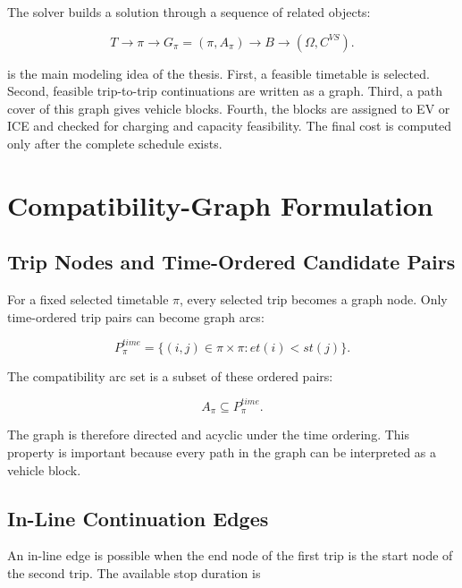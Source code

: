 The solver builds a solution through a sequence of related objects:

\begin{equation}
T
\longrightarrow
\pi
\longrightarrow
G_\pi=(\pi,A_\pi)
\longrightarrow
B
\longrightarrow
(\Omega,C^{VS}).
\label{eq:layered-decision-chain}
\end{equation}

 is the main modeling idea of the thesis.
First, a feasible timetable is selected. Second, feasible trip-to-trip
continuations are written as a graph. Third, a path cover of this graph gives
vehicle blocks. Fourth, the blocks are assigned to EV or ICE and checked for
charging and capacity feasibility. The final cost is computed only after the
complete schedule exists.

\section{Compatibility-Graph Formulation}
\label{sec:compatibility-graph-formulation}

\subsection{Trip Nodes and Time-Ordered Candidate Pairs}

For a fixed selected timetable \(\pi\), every selected trip becomes a graph
node. Only time-ordered trip pairs can become graph arcs:

\begin{equation}
P^{time}_\pi
=
\{(i,j)\in \pi\times\pi: et(i)<st(j)\}.
\label{eq:time-ordered-pairs}
\end{equation}

The compatibility arc set is a subset of these ordered pairs:

\begin{equation}
A_\pi\subseteq P^{time}_\pi.
\label{eq:arc-subset-time}
\end{equation}

The graph is therefore directed and acyclic under the time ordering. This
property is important because every path in the graph can be interpreted as a
vehicle block.

\subsection{In-Line Continuation Edges}

An in-line edge is possible when the end node of the first trip is the start
node of the second trip. The available stop duration is


